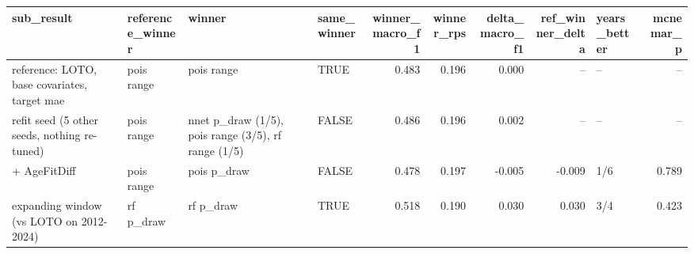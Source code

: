 
\begin{tabular}{llllrrrrlr}
\toprule
sub\_result & reference\_winner & winner & same\_winner & winner\_macro\_f1 & winner\_rps & delta\_macro\_f1 & ref\_winner\_delta & years\_better & mcnemar\_p\\
\midrule
reference: LOTO, base covariates, target mae & pois range & pois range & TRUE & 0.483 & 0.196 & 0.000 & -- & -- & --\\
refit seed (5 other seeds, nothing re-tuned) & pois range & nnet p\_draw (1/5), pois range (3/5), rf range (1/5) & FALSE & 0.486 & 0.196 & 0.002 & -- & -- & --\\
+ AgeFitDiff & pois range & pois p\_draw & FALSE & 0.478 & 0.197 & -0.005 & -0.009 & 1/6 & 0.789\\
expanding window (vs LOTO on 2012-2024) & rf p\_draw & rf p\_draw & TRUE & 0.518 & 0.190 & 0.030 & 0.030 & 3/4 & 0.423\\
\bottomrule
\end{tabular}
